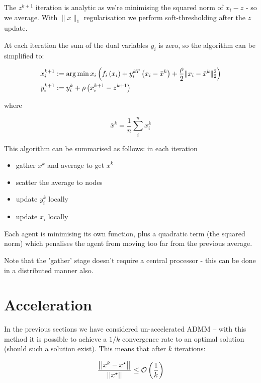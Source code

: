 \begin{example}[Consensus]
The \(z^{k+1}\) iteration is analytic as we're minimising the squared norm of \(x_i - z\) - so we average. With \(\|x\|_1\) regularisation we perform soft-thresholding after the \(z\) update.

At each iteration the sum of the dual variables \(y_i\) is zero, so the algorithm can be simplified to:

\begin{align}
x_i^{k+1} &:= \operatorname*{arg\,min}{x_i} \left(f_i\left( x_i \right) + y_i^{kT}\left(x_i-\bar{x}^k\right) + \frac{\rho}{2}\|x_i-\bar{x}^k\|_2^2\right)\\
y_i^{k+1} &:= y_i^{k} + \rho \left(x_i^{k+1} - z^{k+1} \right)
\label{simple_consensus_iterations}
\end{align}
 
where

\begin{equation}
\bar{x}^k = \frac{1}{n} \sum_i^n x_i^k
\end{equation}

This algorithm can be summarised as follows: in each iteration

\begin{itemize}
\item gather \(x^k\) and average to get \(\bar{x}^k\)
\item scatter the average to nodes
\item update \(y_i^k\) locally
\item update \(x_i\) locally
\end{itemize}

Each agent is minimising its own function, plus a quadratic term (the squared norm) which penalises the agent from moving too far from the previous average.

Note that the 'gather' stage doesn't require a central processor - this can be done in a distributed manner also.
\end{example}

\section{Acceleration}\label{sec:accel}

In the previous sections we have considered un-accelerated ADMM – with this method it is possible to achieve a \(1/k\) convergence rate to an optimal solution (should such a solution exist). This means that after \(k\) iterations:

\begin{equation}
\frac{\left|\left|x^k - x^{\star}\right|\right|}{\left|\left|x^{\star}\right|\right|} \leq \mathcal{O}\left(\frac{1}{k}\right)
\end{equation}


